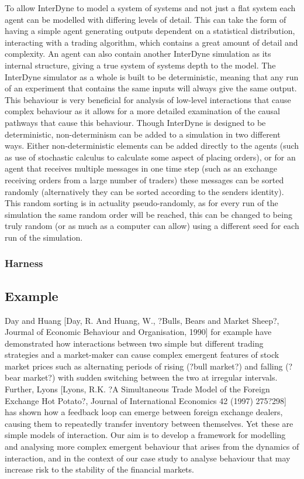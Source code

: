 \documentclass{article}
\begin{document}
To allow InterDyne to model a system of systems and not just a flat system each agent can be modelled with differing levels of detail. This can take the form of having a simple agent generating outputs dependent on a statistical distribution, interacting with a trading algorithm, which contains a great amount of detail and complexity. An agent can also contain another InterDyne simulation as its internal structure, giving a true system of systems depth to the model.
The InterDyne simulator as a whole is built to be deterministic, meaning that any run of an experiment that contains the same inputs will always give the same output. This behaviour is very beneficial for analysis of low-level interactions that cause complex behaviour as it allows for a more detailed examination of the causal pathways that cause this behaviour. Though InterDyne is designed to be deterministic, non-determinism can be added to a simulation in two different ways. Either non-deterministic elements can be added directly to the agents (such as use of stochastic calculus to calculate some aspect of placing orders), or for an agent that receives multiple messages in one time step (such as an exchange receiving orders from a large number of traders) these messages can be sorted randomly (alternatively they can be sorted according to the senders identity).  This random sorting is in actuality pseudo-randomly, as for every run of the simulation the same random order will be reached, this can be changed to being truly random (or as much as a computer can allow) using a different seed for each run of the simulation.


\subsubsection{Harness} 


\subsection{Example}






Day and Huang [Day, R. And Huang, W., ?Bulls, Bears and Market Sheep?, Jourmal of Economic Behaviour and Organisation, 1990] for example have demonstrated how interactions between two simple but different trading strategies and a market-maker can cause complex emergent features of stock market prices such as alternating periods of rising (?bull market?) and falling (?bear market?) with sudden switching between the two at irregular intervals. Further, Lyons [Lyons, R.K. ?A Simultaneous Trade Model of the Foreign Exchange Hot Potato?, Journal of International Economics 42 (1997) 275?298] has shown how a feedback loop can emerge between foreign exchange dealers, causing them to repeatedly transfer inventory between themselves.  Yet these are simple models of interaction.  Our aim is to develop a framework for modelling and analysing more complex emergent behaviour that arises from the dynamics of interaction, and in the context of our case study to analyse behaviour that may increase risk to the stability of the financial markets.
\end{document}
